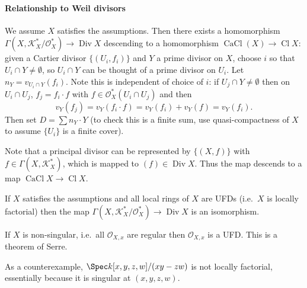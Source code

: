 \documentclass[a4paper]{article}
\newcommand{\sh}[1]{\mathcal{#1}} %
\DeclareMathOperator{\Div}{Div} %
\DeclareMathOperator{\Cl}{Cl} %
\DeclareMathOperator{\CaCl}{CaCl} %
\begin{document}
\paragraph{Relationship to Weil divisors}

We assume \(X\) satisfies the assumptions. Then there exists a homomorphism \(\Gamma(X, \sh K_X^*/\sh O_X^*) \to \Div X\) descending to a homomorphism \(\CaCl(X) \to \Cl X\): given a Cartier divisor \(\{(U_i, f_i)\}\) and \(Y\) a prime divisor on \(X\), choose \(i\) so that \(U_i \cap Y \neq \emptyset\), so \(U_i \cap Y\) can be thought of a prime divisor on \(U_i\). Let \(n_Y = v_{U_i \cap Y}(f_i)\). Note this is independent of choice of \(i\): if \(U_j \cap Y \neq \emptyset\) then on \(U_i \cap U_j\), \(f_j = f_i \cdot f\) with \(f \in \sh O_X^*(U_i \cap U_j)\) and then
\[
  v_Y(f_j) = v_Y(f_i \cdot f) = v_Y(f_i) + v_Y(f) = v_Y(f_i).
\]
Then set \(D = \sum n_Y \cdot Y\) (to check this is a finite sum, use quasi-compactness of \(X\) to assume \(\{U_i\}\) is a finite cover).

Note that a principal divisor can be represented by \(\{(X, f)\}\) with \(f \in \Gamma(X, \sh K_X^*)\), which is mapped to \((f) \in \Div X\). Thus the map descends to a map \(\CaCl X \to \Cl X\).

\begin{proposition}
  If \(X\) satisfies the assumptions and all local rings of \(X\) are UFDs (i.e.\ \(X\) is locally factorial) then the map \(\Gamma(X, \sh K_X^*/\sh O_X^*) \to \Div X\) is an isomorphism.
\end{proposition}

\begin{remark}
  If \(X\) is non-singular, i.e.\ all \(\sh O_{X, x}\) are regular then \(\sh O_{X, x}\) is a UFD. This is a theorem of Serre.

  As a counterexample, \(\Spec k[x, y, z, w]/(xy - zw)\) is not locally factorial, essentially because it is singular at \((x, y, z, w)\).
\end{remark}
\end{document}
